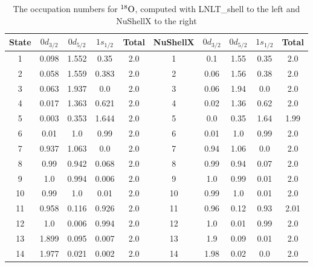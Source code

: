 \begin{table}[ht!]
\caption{The occupation numbers for \(^{18}\rm{O}\), computed with LNLT\_shell to the left and NuShellX to the right}
\begin{tabular}{|c|c|c|c|c|c|c|c|c|c|}
\hline State & $0d_{3/2}$ & $0d_{5/2}$ & $1s_{1/2}$ & Total & NuShellX & $0d_{3/2}$ & $0d_{5/2}$ & $1s_{1/2}$ & Total \\
\hline 1 & 0.098 & 1.552 & 0.35 & 2.0 & 1 & 0.1 & 1.55 & 0.35 & 2.0 \\
\hline 2 & 0.058 & 1.559 & 0.383 & 2.0 & 2 & 0.06 & 1.56 & 0.38 & 2.0 \\
\hline 3 & 0.063 & 1.937 & 0.0 & 2.0 & 3 & 0.06 & 1.94 & 0.0 & 2.0 \\
\hline 4 & 0.017 & 1.363 & 0.621 & 2.0 & 4 & 0.02 & 1.36 & 0.62 & 2.0 \\
\hline 5 & 0.003 & 0.353 & 1.644 & 2.0 & 5 & 0.0 & 0.35 & 1.64 & 1.99 \\
\hline 6 & 0.01 & 1.0 & 0.99 & 2.0 & 6 & 0.01 & 1.0 & 0.99 & 2.0 \\
\hline 7 & 0.937 & 1.063 & 0.0 & 2.0 & 7 & 0.94 & 1.06 & 0.0 & 2.0 \\
\hline 8 & 0.99 & 0.942 & 0.068 & 2.0 & 8 & 0.99 & 0.94 & 0.07 & 2.0 \\
\hline 9 & 1.0 & 0.994 & 0.006 & 2.0 & 9 & 1.0 & 0.99 & 0.01 & 2.0 \\
\hline 10 & 0.99 & 1.0 & 0.01 & 2.0 & 10 & 0.99 & 1.0 & 0.01 & 2.0 \\
\hline 11 & 0.958 & 0.116 & 0.926 & 2.0 & 11 & 0.96 & 0.12 & 0.93 & 2.01 \\
\hline 12 & 1.0 & 0.006 & 0.994 & 2.0 & 12 & 1.0 & 0.01 & 0.99 & 2.0 \\
\hline 13 & 1.899 & 0.095 & 0.007 & 2.0 & 13 & 1.9 & 0.09 & 0.01 & 2.0 \\
\hline 14 & 1.977 & 0.021 & 0.002 & 2.0 & 14 & 1.98 & 0.02 & 0.0 & 2.0 \\
\hline
\end{tabular}
\end{table}

